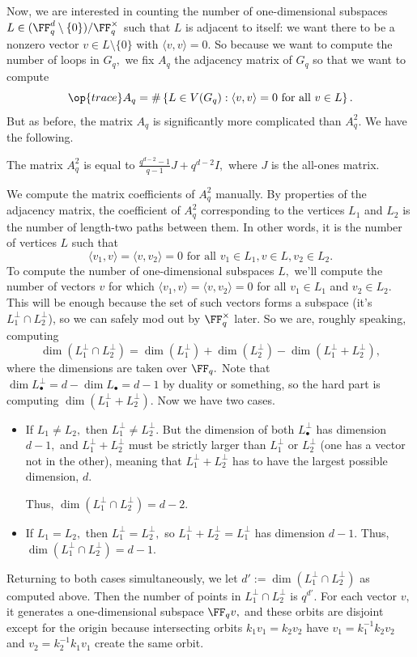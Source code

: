 Now, we are interested in counting the number of one-dimensional subspaces $L\in(\FF_q^d\setminus\{0\})/\FF_q^\times$ such that $L$ is adjacent to itself: we want there to be a nonzero vector $v\in L\setminus\{0\}$ with $\langle v,v\rangle=0.$ So because we want to compute the number of loops in $G_q,$ we fix $A_q$ the adjacency matrix of $G_q$ so that we want to compute
\[\op{trace}A_q=\#\left\{L\in V(G_q):\langle v,v\rangle=0\text{ for all }v\in L\right\}.\]
But as before, the matrix $A_q$ is significantly more complicated than $A_q^2.$ We have the following.
\begin{lemma}
    The matrix $A_q^2$ is equal to $\frac{q^{d-2}-1}{q-1}J+q^{d-2}I,$ where $J$ is the all-ones matrix.
\end{lemma}
We compute the matrix coefficients of $A_q^2$ manually. By properties of the adjacency matrix, the coefficient of $A_q^2$ corresponding to the vertices $L_1$ and $L_2$ is the number of length-two paths between them. In other words, it is the number of vertices $L$ such that
\[\langle v_1,v\rangle=\langle v,v_2\rangle=0\text{ for all }v_1\in L_1,v\in L,v_2\in L_2.\]
To compute the number of one-dimensional subspaces $L,$ we'll compute the number of vectors $v$ for which $\langle v_1,v\rangle=\langle v,v_2\rangle=0$ for all $v_1\in L_1$ and $v_2\in L_2.$ This will be enough because the set of such vectors forms a subspace (it's $L_1^\perp\cap L_2^\perp$), so we can safely mod out by $\FF_q^\times$ later. So we are, roughly speaking, computing
\[\dim\left(L_1^\perp\cap L_2^\perp\right)=\dim\left(L_1^\perp\right)+\dim\left(L_2^\perp\right)-\dim\left(L_1^\perp+L_2^\perp\right),\]
where the dimensions are taken over $\FF_q.$ Note that $\dim L_\bullet^\perp=d-\dim L_\bullet=d-1$ by duality or something, so the hard part is computing $\dim\left(L_1^\perp+L_2^\perp\right).$ Now we have two cases.
\begin{itemize}
    \item If $L_1\ne L_2,$ then $L_1^\perp\ne L_2^\perp.$ But the dimension of both $L_\bullet^\perp$ has dimension $d-1,$ and $L_1^\perp+L_2^\perp$ must be strictly larger than $L_1^\perp$ or $L_2^\perp$ (one has a vector not in the other), meaning that $L_1^\perp+L_2^\perp$ has to have the largest possible dimension, $d.$
    
    Thus, $\dim\left(L_1^\perp\cap L_2^\perp\right)=d-2.$
    \item If $L_1=L_2,$ then $L_1^\perp=L_2^\perp,$ so $L_1^\perp+L_2^\perp=L_1^\perp$ has dimension $d-1.$ Thus, $\dim\left(L_1^\perp\cap L_2^\perp\right)=d-1.$
\end{itemize}
Returning to both cases simultaneously, we let $d':=\dim\left(L_1^\perp\cap L_2^\perp\right)$ as computed above. Then the number of points in $L_1^\perp\cap L_2^\perp$ is $q^{d'}.$ For each vector $v,$ it generates a one-dimensional subspace $\FF_qv,$ and these orbits are disjoint except for the origin because intersecting orbits $k_1v_1=k_2v_2$ have $v_1=k_1^{-1}k_2v_2$ and $v_2=k_2^{-1}k_1v_1$ create the same orbit.

